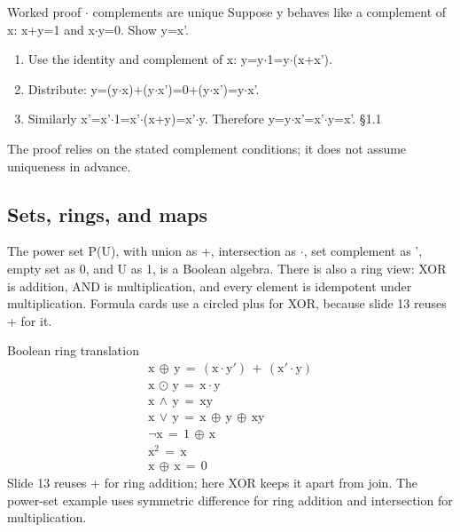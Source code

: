 \documentclass[11pt]{article}
\begin{document}
\begin{keepsection}
\begin{keepsection}
\begin{workedbox}{Worked proof \ensuremath{\cdot} complements are unique}
Suppose y behaves like a complement of x: x+y=1 and x\ensuremath{\cdot}y=0. Show y=x'.

\begin{enumerate}
\item Use the identity and complement of x: y=y\ensuremath{\cdot}1=y\ensuremath{\cdot}(x+x').
\item Distribute: y=(y\ensuremath{\cdot}x)+(y\ensuremath{\cdot}x')=0+(y\ensuremath{\cdot}x')=y\ensuremath{\cdot}x'.
\item Similarly x'=x'\ensuremath{\cdot}1=x'\ensuremath{\cdot}(x+y)=x'\ensuremath{\cdot}y. Therefore y=y\ensuremath{\cdot}x'=x'\ensuremath{\cdot}y=x'. \hfill{\small\color{FAUblue}§1.1}
\end{enumerate}

The proof relies on the stated complement conditions; it does not assume uniqueness in advance.
\end{workedbox}
\end{keepsection}

\begin{keepsection}
\subsection{Sets, rings, and maps}

The power set P(U), with union as +, intersection as \ensuremath{\cdot}, set complement as ', empty set as 0, and U as 1, is a Boolean algebra. There is also a ring view: XOR is addition, AND is multiplication, and every element is idempotent under multiplication. Formula cards use a circled plus for XOR, because slide 13 reuses + for it.

\begin{equationcard}{Boolean ring translation}
\[ \begin{gathered} \mathrm{x}\, ⊕\, \mathrm{y}\, =\, (\mathrm{x}\cdot \mathrm{y}')\, +\, (\mathrm{x}'\cdot \mathrm{y}) \\ \mathrm{x}\, ⊙\, \mathrm{y}\, =\, \mathrm{x}\cdot \mathrm{y} \\ \mathrm{x}\, \land \, \mathrm{y}\, =\, \text{xy} \\ \mathrm{x}\, \lor \, \mathrm{y}\, =\, \mathrm{x}\, ⊕\, \mathrm{y}\, ⊕\, \text{xy} \\ \neg \mathrm{x}\, =\, 1\, ⊕\, \mathrm{x} \\ \mathrm{x}^{2}\, =\, \mathrm{x} \\ \mathrm{x}\, ⊕\, \mathrm{x}\, =\, 0 \end{gathered} \]
{\small Slide 13 reuses + for ring addition; here XOR keeps it apart from join. The power-set example uses symmetric difference for ring addition and intersection for multiplication.}
\end{equationcard}


\end{keepsection}
\end{keepsection}
\end{document}

